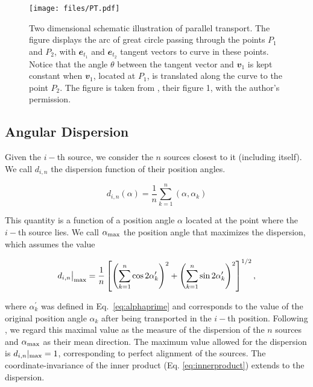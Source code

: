 		
\begin{figure}
	\centering
	\texttt{[image: files/PT.pdf]}
	\caption{Two dimensional schematic illustration of parallel transport. The figure displays the arc of great circle passing through the points $P_1$ and $P_2$, with $\mathbfit{e}_{t_1}$ and $\mathbfit{e}_{t_2}$ tangent vectors to curve in these points. Notice that the angle $\theta$ between the tangent vector and $\mathbfit{v}_{1}$ is kept constant when $\mathbfit{v}_{1}$, located at $P_1$, is translated along the curve to the point $P_2$. The figure is taken from \citet{Jain2004}, their figure 1, with the author's permission.}
	\label{fig:PT}
\end{figure}	

	\subsection{Angular Dispersion}
		\label{sec:S}
		Given the $i-$th source, we consider the $n$ sources closest to it (including itself). We call $d_{i,n}$ the dispersion function of their position angles.
		
		\begin{equation}
			d_{i, n}(\alpha) = \frac{1}{n}\sum_{k=1}^{n} (\alpha, \alpha_k)
			\label{eq:d}
		\end{equation}
		
		This quantity is a function of a position angle $\alpha$ located at the point where the $i-$th source lies. We call $\alpha_{\rm{max}}$ the position angle that maximizes the dispersion, which assumes the value
		
		\begin{equation}
			d_{i, n}\big|_{\rm{max}} =  \frac{1}{n} \left[ 
			\left( \sum_{k=1}^{n} \cos 2\alpha_k^\prime\right)^2
			+
			\left( \sum_{k=1}^{n} \sin 2\alpha_k^\prime\right)^2
			\right]^{1/2},
		\end{equation}
		
		where $\alpha_k^\prime$ was defined in Eq.~\eqref{eq:alphaprime} and corresponds to the value of the original position angle $\alpha_k$ after being transported in the $i-$th position. Following \cite{Jain2004}, we regard this maximal value as the measure of the dispersion of the $n$ sources and $\alpha_{\rm{max}}$ as their mean direction. The maximum value allowed for the dispersion is $d_{i, n}|_{\rm{max}} = 1$, corresponding to perfect alignment of the sources. The coordinate-invariance of the inner product (Eq. \ref{eq:innerproduct}) extends to the dispersion.
		
